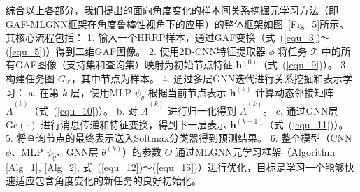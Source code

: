 综合以上各部分，我们提出的面向角度变化的样本间关系挖掘元学习方法（即GAF-MLGNN框架在角度鲁棒性视角下的应用）的整体框架如图~\ref{Fig_5}所示。其核心流程包括：
1.  输入一个HRRP样本，通过GAF变换（式~(\ref{equ_3})〜(\ref{equ_5})）得到二维GAF图像。
2.  使用2D-CNN特征提取器 $\phi$ 将任务 $\mathcal{T}$ 中的所有GAF图像（支持集和查询集）映射为初始节点特征 $\mathbf{h}^{(0)}$（式~(\ref{equ_9})）。
3.  构建任务图 $G_{\mathcal{T}}$，其中节点为样本。
4.  通过多层GNN迭代进行关系挖掘和表示学习：
    a.  在第 $k$ 层，使用MLP $\psi_{\tilde{\theta}}$ 根据当前节点表示 $\mathbf{h}^{(k)}$ 计算动态邻接矩阵 $\tilde{A}^{(k)}$（式~(\ref{equ_10})）。
    b.  对 $\tilde{A}^{(k)}$ 进行归一化得到 $\hat{A}^{(k)}$。
    c.  通过GNN层 $\mathrm{Gc}(\cdot)$ 进行消息传递和特征变换，得到下一层表示 $\mathbf{h}^{(k+1)}$（式~(\ref{equ_11})）。
5.  将查询节点的最终表示送入Softmax分类器得到预测结果。
6.  整个模型（CNN $\phi$、MLP $\psi_{\tilde{\theta}}$、GNN层 $\theta^{(k)}$）的参数 $\Theta$ 通过MLGNN元学习框架（Algorithm \ref{Alg_1}, \ref{Alg_2}, 式~(\ref{equ_12})〜(\ref{equ_15})）进行优化，目标是学习一个能够快速适应包含角度变化的新任务的良好初始化。
